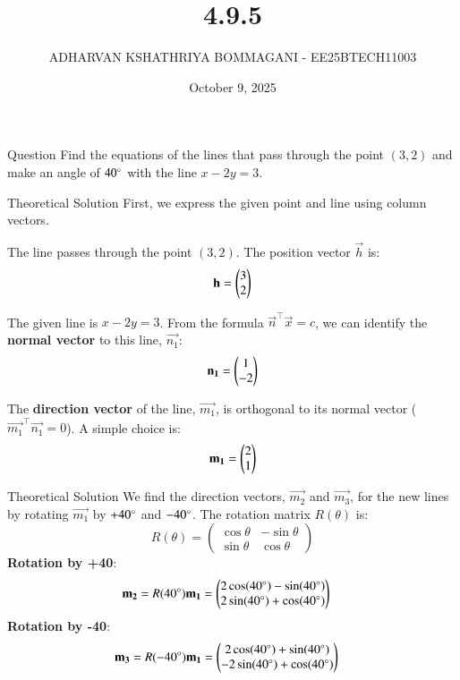 \documentclass{beamer}
\title{4.9.5}
\date{October 9, 2025}
\author{ADHARVAN KSHATHRIYA BOMMAGANI - EE25BTECH11003}
\begin{document}
\frame{\titlepage}

\begin{frame}{Question}
Find the equations of the lines that pass through the point $(3,2)$ and make an angle of $40\degree$ with the line $x - 2y = 3$.
\end{frame}

\begin{frame}{Theoretical Solution}
First, we express the given point and line using column vectors.
\bigskip

The line passes through the point $(3, 2)$. The position vector $\vec{h}$ is:
$$ \mathbf{h} = \begin{pmatrix}3 \\ 2\end{pmatrix} $$
\bigskip

The given line is $x - 2y = 3$. From the formula $\vec{n}^\top \vec{x} = c$, we can identify the \textbf{normal vector} to this line, $\vec{n_1}$:
$$ \mathbf{n_1} = \begin{pmatrix}1 \\ -2\end{pmatrix} $$
\bigskip

The \textbf{direction vector} of the line, $\vec{m_1}$, is orthogonal to its normal vector ($\vec{m_1}^\top \vec{n_1} = 0$). A simple choice is:
$$ \mathbf{m_1} = \begin{pmatrix}2 \\ 1\end{pmatrix} $$
\end{frame}

\begin{frame}{Theoretical Solution}
We find the direction vectors, $\vec{m_2}$ and $\vec{m_3}$, for the new lines by rotating $\vec{m_1}$ by $+40\degree$ and $-40\degree$.
\bigskip
The rotation matrix $R(\theta)$ is:
$$ R(\theta) = \begin{pmatrix} \cos\theta & -\sin\theta \\ \sin\theta & \cos\theta \end{pmatrix} $$
\bigskip
\textbf{Rotation by +40\degree}:
\begin{align*}
\mathbf{m_2} = R(40\degree) \mathbf{m_1} &= \begin{pmatrix}2\cos(40\degree) - \sin(40\degree) \\ 2\sin(40\degree) + \cos(40\degree)\end{pmatrix}
\end{align*}
\textbf{Rotation by -40\degree}:
\begin{align*}
\mathbf{m_3} = R(-40\degree) \mathbf{m_1} &= \begin{pmatrix}2\cos(40\degree) + \sin(40\degree) \\ -2\sin(40\degree) + \cos(40\degree)\end{pmatrix}
\end{align*}
\end{frame}
\end{document}
